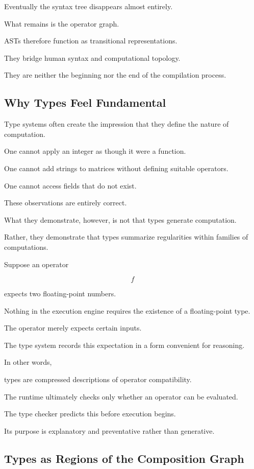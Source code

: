 \documentclass[12pt,oneside]{article}
\begin{document}
Eventually the syntax tree disappears almost entirely.

What remains is the operator graph.

ASTs therefore function as transitional representations.

They bridge human syntax and computational topology.

They are neither the beginning nor the end of the compilation process.

\subsection{Why Types Feel Fundamental}

Type systems often create the impression that they define the nature of computation.

One cannot apply an integer as though it were a function.

One cannot add strings to matrices without defining suitable operators.

One cannot access fields that do not exist.

These observations are entirely correct.

What they demonstrate, however, is not that types generate computation.

Rather, they demonstrate that types summarize regularities within families of computations.

Suppose an operator

\[
f
\]

expects two floating-point numbers.

Nothing in the execution engine requires the existence of a floating-point type.

The operator merely expects certain inputs.

The type system records this expectation in a form convenient for reasoning.

In other words,

types are compressed descriptions of operator compatibility.

The runtime ultimately checks only whether an operator can be evaluated.

The type checker predicts this before execution begins.

Its purpose is explanatory and preventative rather than generative.

\subsection{Types as Regions of the Composition Graph}
\end{document}
